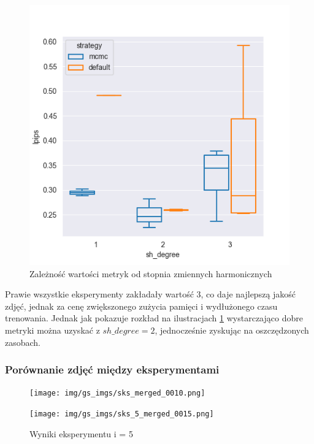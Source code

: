 \begin{figure}[h!]
\begin{minipage}{0.3\textwidth}
    \end{minipage}
    \hfill
    \begin{minipage}{0.3\textwidth}
        \centering
        \includegraphics[width=\textwidth]{img/gs_metrics/lpips_sh_degree.png}
    \end{minipage}
    \caption{Zależność wartości metryk od stopnia zmiennych harmonicznych}
    \label{fig:sh_deg_gs_metrics}
\end{figure}

Prawie wszystkie eksperymenty zakładały wartość 3, co daje najlepszą jakość zdjęć, jednak za cenę zwiększonego zużycia pamięci i wydłużonego czasu trenowania. Jednak jak pokazuje rozkład na ilustracjach \ref{fig:sh_deg_gs_metrics} wystarczająco dobre metryki można uzyskać z $sh\_degree = 2$, jednocześnie zyskując na oszczędzonych zasobach. 

\pagebreak

\subsubsection{Porównanie zdjęć między eksperymentami}

\begin{figure}[htb]
    \begin{minipage}[c][4.4cm]{\columnwidth}
        \centering
        \texttt{[image: img/gs\_imgs/sks\_merged\_0010.png]}
    \end{minipage}
    \vfill
    \begin{minipage}[c][4.4cm]{\columnwidth}
        \centering
        \texttt{[image: img/gs\_imgs/sks\_5\_merged\_0015.png]}
    \end{minipage} 
    \caption{Wyniki eksperymentu i = 5}
    \label{fig:eval_sks}
\end{figure}


